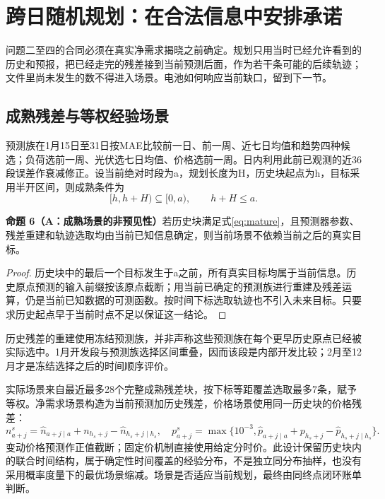 \documentclass[UTF8,a4paper,zihao=-4,fontset=mac]{ctexart}
\newcommand{\pp}[2]{\par\ifdim\dimexpr\pagegoal-\pagetotal\relax<5\baselineskip\newpage\fi\noindent\textbf{命题 #1（#2）}\quad}
\begin{document}
\section{跨日随机规划：在合法信息中安排承诺}
问题二至四的合同必须在真实净需求揭晓之前确定。规划只用当时已经允许看到的历史和预报，把已经走完的残差接到当前预测后面，作为若干条可能的后续轨迹；文件里尚未发生的数不得进入场景。电池如何响应当前缺口，留到下一节。

\subsection{成熟残差与等权经验场景}
预测族在1月15日至31日按MAE比较前一日、前一周、近七日均值和趋势四种候选；负荷选前一周、光伏选七日均值、价格选前一周。日内利用此前已观测的近36段误差作衰减修正。设当前绝对时段为a，规划长度为H，历史块起点为h，目标采用半开区间，则成熟条件为
\begin{equation}\label{eq:mature}
 [h,h+H)\subseteq[0,a),\qquad h+H\le a.
\end{equation}
\pp{6}{A：成熟场景的非预见性}若历史块满足式\eqref{eq:mature}，且预测器参数、残差重建和轨迹选取均由当前已知信息确定，则当前场景不依赖当前之后的真实目标。
\begin{proof}
历史块中的最后一个目标发生于a之前，所有真实目标均属于当前信息。历史原点预测的输入前缀按该原点截断；用当前已确定的预测族进行重建及残差运算，仍是当前已知数据的可测函数。按时间下标选取轨迹也不引入未来目标。只要求历史起点早于当前时点不足以保证这一结论。
\end{proof}
历史残差的重建使用冻结预测族，并非声称这些预测族在每个更早历史原点已经被实际选中。1月开发段与预测族选择区间重叠，因而该段是内部开发比较；2月至12月才是冻结选择之后的时间顺序评价。

实际场景来自最近最多28个完整成熟残差块，按下标等距覆盖选取最多7条，赋予等权。净需求场景构造为当前预测加历史残差，价格场景使用同一历史块的价格残差：
\begin{equation}\label{eq:scenario}
 n_{a+j}^{s}=\widehat n_{a+j\mid a}+n_{h_s+j}-\widehat n_{h_s+j\mid h_s},\quad
 p_{a+j}^{s}=\max\{10^{-3},\widehat p_{a+j\mid a}+p_{h_s+j}-\widehat p_{h_s+j\mid h_s}\}.
\end{equation}
变动价格预测作正值截断；固定价机制直接使用给定分时价。此设计保留历史块内的联合时间结构，属于确定性时间覆盖的经验分布，不是独立同分布抽样，也没有采用概率度量下的最优场景缩减\cite{dupacova2003,kaut2007}。场景是否适应当前规划，最终由同终点闭环账单判断。


\end{document}
